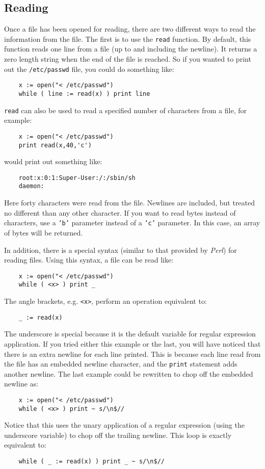 \subsection{Reading}
\label{read-func}
Once a file has been opened for reading, there are two different ways to read the
information from the file. The first is to use the {\tt read} function. By default,
this function reads one line from a file (up to and including the newline). It returns
a zero length string when the end of the file is reached. So if you wanted to print
out the {\tt /etc/passwd} file, you could do something like:
\begin{verbatim}
    x := open("< /etc/passwd")
    while ( line := read(x) ) print line
\end{verbatim}
{\tt read} can also be used to read a specified number of characters from a file, for
example:
\begin{verbatim}
    x := open("< /etc/passwd")
    print read(x,40,'c')
\end{verbatim}
would print out something like:
\begin{verbatim}
    root:x:0:1:Super-User:/:/sbin/sh
    daemon:
\end{verbatim}
Here forty characters were read from the file. Newlines are included, but treated no different
than any other character. If you want to read bytes instead of characters, use a {\tt 'b'}
parameter instead of a {\tt 'c'} parameter. In this case, an array of bytes will be returned.

In addition, there is a special syntax (similar to that provided by {\em Perl}) for reading
files. Using this syntax, a file can be read like:
\begin{verbatim}
    x := open("< /etc/passwd")
    while ( <x> ) print _
\end{verbatim}
\label{io-and-regex}
The angle brackets, e.g. \verb+<x>+, perform an operation equivalent to:
\begin{verbatim}
    _ := read(x)
\end{verbatim}
The underscore is special because it is the default variable for regular expression
application. If you tried either this example or the last, you will have noticed that
there is an extra newline for each line printed. This is because each line read from
the file has an embedded newline character, and the {\tt print} statement adds another
newline. The last example could be rewritten to chop off the embedded newline as:
\begin{verbatim}
    x := open("< /etc/passwd")
    while ( <x> ) print ~ s/\n$//
\end{verbatim}
Notice that this uses the unary application of a regular expression (using the underscore
variable) to chop off the trailing newline. This loop is exactly equivalent to:
\begin{verbatim}
    while ( _ := read(x) ) print _ ~ s/\n$//
\end{verbatim}

